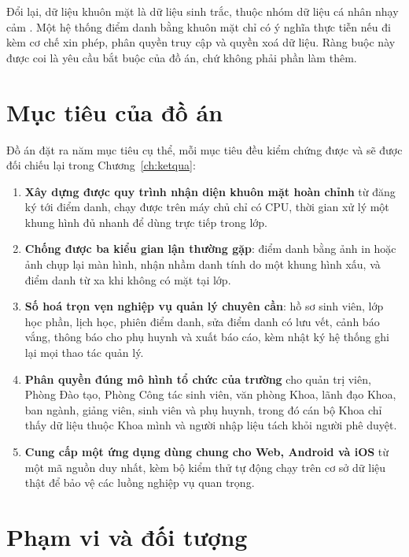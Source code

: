 \begin{luuy}
Đổi lại, dữ liệu khuôn mặt là dữ liệu sinh trắc, thuộc nhóm dữ liệu cá nhân
nhạy cảm \cite{Luat912025, ND3562025}. Một hệ thống điểm danh bằng khuôn mặt chỉ có ý nghĩa thực tiễn nếu
đi kèm cơ chế xin phép, phân quyền truy cập và quyền xoá dữ liệu. Ràng buộc
này được coi là yêu cầu bắt buộc của đồ án, chứ không phải phần làm thêm.
\end{luuy}

\section{Mục tiêu của đồ án}
\label{sec:muctieu}

Đồ án đặt ra năm mục tiêu cụ thể, mỗi mục tiêu đều kiểm chứng được và sẽ
được đối chiếu lại trong Chương~\ref{ch:ketqua}:

\begin{enumerate}[label=\textbf{MT\arabic*.}, leftmargin=3.0em, itemsep=3pt]
  \item \textbf{Xây dựng được quy trình nhận diện khuôn mặt hoàn chỉnh} từ
        đăng ký tới điểm danh, chạy được trên máy chủ chỉ có CPU, thời gian
        xử lý một khung hình đủ nhanh để dùng trực tiếp trong lớp.
  \item \textbf{Chống được ba kiểu gian lận thường gặp}: điểm danh bằng ảnh
        in hoặc ảnh chụp lại màn hình, nhận nhầm danh tính do một khung hình
        xấu, và điểm danh từ xa khi không có mặt tại lớp.
  \item \textbf{Số hoá trọn vẹn nghiệp vụ quản lý chuyên cần}: hồ sơ sinh
        viên, lớp học phần, lịch học, phiên điểm danh, sửa điểm danh có lưu
        vết, cảnh báo vắng, thông báo cho phụ huynh và xuất báo cáo, kèm nhật
        ký hệ thống ghi lại mọi thao tác quản lý.
  \item \textbf{Phân quyền đúng mô hình tổ chức của trường} cho quản trị
        viên, Phòng Đào tạo, Phòng Công tác sinh viên, văn phòng Khoa, lãnh
        đạo Khoa, ban ngành, giảng viên, sinh viên và phụ huynh, trong đó cán
        bộ Khoa chỉ thấy dữ liệu thuộc Khoa mình và người nhập liệu tách khỏi
        người phê duyệt.
  \item \textbf{Cung cấp một ứng dụng dùng chung cho Web, Android và iOS}
        từ một mã nguồn duy nhất, kèm bộ kiểm thử tự động chạy trên cơ sở dữ
        liệu thật để bảo vệ các luồng nghiệp vụ quan trọng.
\end{enumerate}

\section{Phạm vi và đối tượng}

